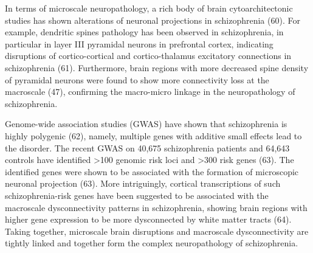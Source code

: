 \begin{refsection}
In terms of microscale neuropathology, a rich body of brain cytoarchitectonic studies has shown alterations of neuronal projections in schizophrenia (60). For example, dendritic spines pathology has been observed in schizophrenia, in particular in layer III pyramidal neurons in prefrontal cortex, indicating disruptions of cortico-cortical and cortico-thalamus excitatory connections in schizophrenia (61). Furthermore, brain regions with more decreased spine density of pyramidal neurons were found to show more connectivity loss at the macroscale (47), confirming the macro-micro linkage in the neuropathology of schizophrenia. 

Genome-wide association studies (GWAS) have shown that schizophrenia is highly polygenic (62), namely, multiple genes with additive small effects lead to the disorder. The recent GWAS on 40,675 schizophrenia patients and 64,643 controls have identified >100 genomic risk loci and >300 risk genes (63). The identified genes were shown to be associated with the formation of microscopic neuronal projection (63). More intriguingly, cortical transcriptions of such schizophrenia-risk genes have been suggested to be associated with the macroscale dysconnectivity patterns in schizophrenia, showing brain regions with higher gene expression to be more dysconnected by white matter tracts (64). Taking together, microscale brain disruptions and macroscale dysconnectivity are tightly linked and together form the complex neuropathology of schizophrenia.


\end{refsection}
